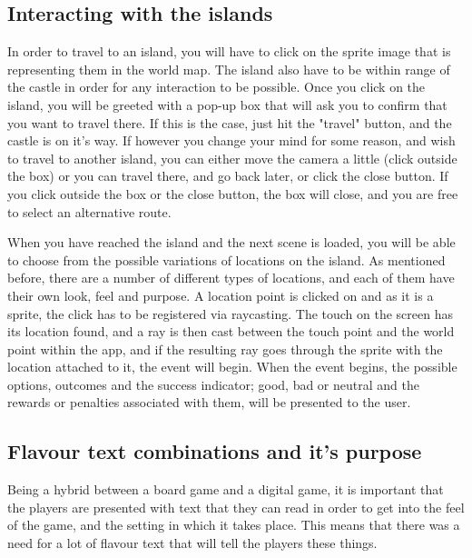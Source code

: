 \subsection{Interacting with the islands}
In order to travel to an island, you will have to click on the sprite image that is representing them in the world map. The island also have to be within range of the castle in order for any interaction to be possible. 
Once you click on the island, you will be greeted with a pop-up box that will ask you to confirm that you want to travel there. If this is the case, just hit the "travel" button, and the castle is on it's way. If however you change your mind for some reason, and wish to travel to another island, you can either move the camera a little (click outside the box) or you can travel there, and go back later, or click the close button. If you click outside the box or the close button, the box will close, and you are free to select an alternative route.

When you have reached the island and the next scene is loaded, you will be able to choose from the possible variations of locations on the island. As mentioned before, there are a number of different types of locations, and each of them have their own look, feel and purpose.
A location point is clicked on and as it is a sprite, the click has to be registered via raycasting. The touch on the screen has its location found, and a ray is then cast between the touch point and the world point within the app, and if the resulting ray goes through the sprite with the location attached to it, the event will begin. When the event begins, the possible options, outcomes and the success indicator; good, bad or neutral and the rewards or penalties associated with them, will be presented to the user.

\subsection{Flavour text combinations and it's purpose}
Being a hybrid between a board game and a digital game, it is important that the players are presented with text that they can read in order to get into the feel of the game, and the setting in which it takes place. This means that there was a need for a lot of flavour text that will tell the players these things. 

